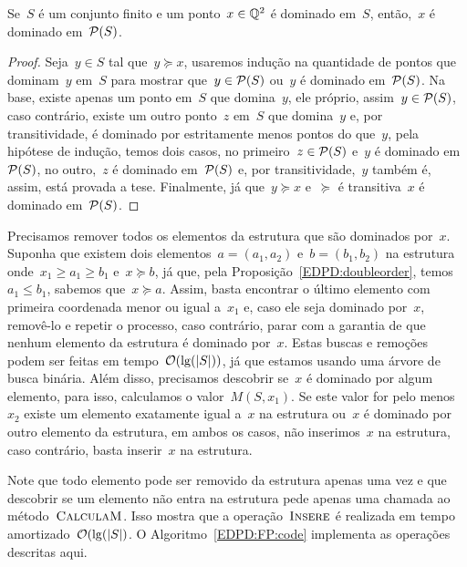 \begin{prop} \label{EDPD:DomP}
Se~$S$ é um conjunto finito e um ponto~$x \in \mathbb{Q}^2$ é dominado em~$S$, então,~$x$ é dominado em~$\mathcal{P}(S)$.
\end{prop}

\begin{proof}
Seja~$y \in S$ tal que~$y \succeq x$, usaremos indução na quantidade de pontos que dominam~$y$ em~$S$ para mostrar que~$y \in \mathcal{P}(S)$ ou~$y$ é dominado em~$\mathcal{P}(S)$. Na base, existe apenas um ponto em~$S$ que domina~$y$, ele próprio, assim~$y \in \mathcal{P}(S)$, caso contrário, existe um outro ponto~$z$ em~$S$ que domina~$y$ e, por transitividade, é dominado por estritamente menos pontos do que~$y$, pela hipótese de indução, temos dois casos, no primeiro~$z \in \mathcal{P}(S)$ e~$y$ é dominado em~$\mathcal{P}(S)$, no outro,~$z$ é dominado em~$\mathcal{P}(S)$ e, por transitividade,~$y$ também é, assim, está provada a tese. Finalmente, já que~$y \succeq x$ e~$\succeq$ é transitiva~$x$ é dominado em~$\mathcal{P}(S)$.
\end{proof}

Precisamos remover todos os elementos da estrutura que são dominados por~$x$. Suponha que existem dois elementos~$a = (a_1,a_2)$ e~$b = (b_1,b_2)$ na estrutura onde~$x_1 \geq a_1 \geq b_1$ e~$x \succeq b$, já que, pela Proposição~\ref{EDPD:doubleorder}, temos~$a_1 \leq b_1$, sabemos que~$x \succeq a$. Assim, basta encontrar o último elemento com primeira coordenada menor ou igual a~$x_1$ e, caso ele seja dominado por~$x$, removê-lo e repetir o processo, caso contrário, parar com a garantia de que nenhum elemento da estrutura é dominado por~$x$. Estas buscas e remoções podem ser feitas em tempo~$\mathcal{O}(\lg(|S|))$, já que estamos usando uma árvore de busca binária. Além disso, precisamos descobrir se~$x$ é dominado por algum elemento, para isso, calculamos o valor~$M(S,x_1)$. Se este valor for pelo menos~$x_2$ existe um elemento exatamente igual a~$x$ na estrutura ou~$x$ é dominado por outro elemento da estrutura, em ambos os casos, não inserimos~$x$ na estrutura, caso contrário, basta inserir~$x$ na estrutura.

Note que todo elemento pode ser removido da estrutura apenas uma vez e que descobrir se um elemento não entra na estrutura pede apenas uma chamada ao método~$\textsc{CalculaM}$. Isso mostra que a operação~$\textsc{Insere}$ é realizada em tempo amortizado~$\mathcal{O}(\lg(|S|)$. O Algoritmo~\ref{EDPD:FP:code} implementa as operações descritas aqui.

